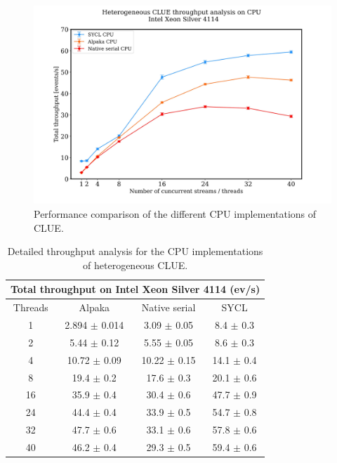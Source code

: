 \begin{figure}[H]
    \centering
    \includegraphics[width=\textwidth]{media/hclue_cpu_performance.jpg}
    \caption{Performance comparison of the different CPU implementations of CLUE.}
    \label{fig:hclue_cpu_performance}
\end{figure}

\begin{table}[htb]
    \centering
    \begin{tabular}{|c|c|c|c|}
 \hline
 \multicolumn{4}{|c|}{Total throughput on Intel Xeon Silver 4114 (ev/s)} \\
 \hline
 Threads & Alpaka & Native serial & SYCL\\
 \hline
 1 & 2.894 $\pm$ 0.014 & 3.09 $\pm$ 0.05 & 8.4 $\pm$ 0.3 \\
 2 & 5.44 $\pm$ 0.12 & 5.55 $\pm$ 0.05 & 8.6 $\pm$	0.3 \\
 4 & 10.72 $\pm$ 0.09 &	10.22 $\pm$	0.15 & 14.1 $\pm$ 0.4 \\
 8 & 19.4 $\pm$ 0.2 & 17.6 $\pm$ 0.3 & 20.1 $\pm$ 0.6 \\
 16 & 35.9 $\pm$ 0.4 & 30.4 $\pm$ 0.6 & 47.7 $\pm$ 0.9 \\
 24	& 44.4 $\pm$ 0.4 & 33.9 $\pm$ 0.5 & 54.7 $\pm$ 0.8 \\
 32	& 47.7 $\pm$ 0.6 & 33.1 $\pm$ 0.6 & 57.8 $\pm$ 0.6 \\
 40	& 46.2 $\pm$ 0.4	& 29.3 $\pm$ 0.5	& 59.4 $\pm$ 0.6 \\
 \hline
\end{tabular}
    \caption{Detailed throughput analysis for the CPU implementations of heterogeneous CLUE.}
    \label{tab:hclue_cpu_performance}
\end{table}

